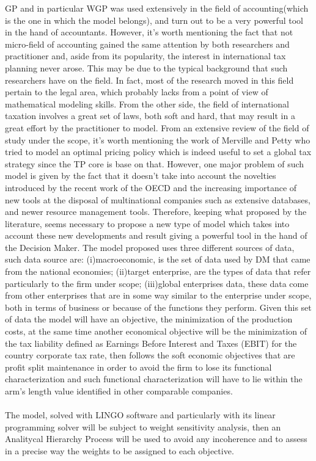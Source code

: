 \documentclass{article}
\begin{document}
GP and in particular WGP was used extensively in the field of accounting\cite{aouni_goal_2017}(which is the one in which the model belongs), and turn out to be a very powerful tool in the hand of accountants. However, it's worth mentioning the fact that not micro-field of accounting gained the same attention by both researchers and practitioner and, aside from its popularity, the interest in international tax planning never arose. This may be due to the typical background that such researchers have on the field. In fact, most of the research moved in this field pertain to the legal area, which probably lacks from a point of view of mathematical modeling skills. From the other side, the field of international taxation involves a great set of laws, both soft and hard, that may result in a great effort by the practitioner to model. 
From an extensive review of the field of study under the scope, it’s worth mentioning the work of Merville and Petty\cite{merville_transfer_1978} who tried to model an optimal pricing policy which is indeed useful to set a global tax strategy since the TP core is base on that. However, one major problem of such model is given by the fact that it doesn't take into account the novelties introduced by the recent work of the OECD and the increasing importance of new tools at the disposal of multinational companies such as extensive databases, and newer resource management tools.
Therefore, keeping what proposed by the literature, seems necessary to propose a new type of model which takes into account these new developments and result giving a powerful tool in the hand of the Decision Maker.
The model proposed uses three different sources of data, such data source are: (i)macroeconomic, is the set of data used by DM that came from the national economies; (ii)target enterprise, are the types of data that refer particularly to the firm under scope; (iii)global enterprises data, these data come from other enterprises that are in some way similar to the enterprise under scope, both in terms of business or because of the functions they perform.
Given this set of data the model will have an objective, the minimization of the production costs, at the same time another economical objective will be the minimization of the tax liability defined as Earnings Before Interest and Taxes (EBIT) for the country corporate tax rate, then follows the soft economic objectives that are profit split maintenance in order to avoid the firm to lose its functional characterization and such functional characterization will have to lie within the arm's length value identified in other comparable companies.
\\
\\
The model, solved with LINGO software and particularly with its linear programming solver will be subject to weight sensitivity analysis, then an Analitycal Hierarchy Process will be used to avoid any incoherence and to assess in a precise way the weights to be assigned to each objective.
\pagebreak
\printbibliography
\end{document}
